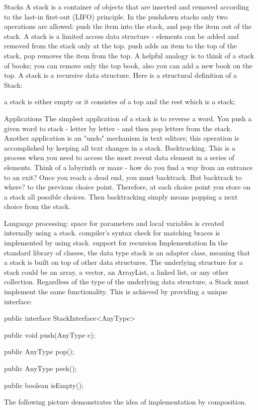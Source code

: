 Stacks
A stack is a container of objects that are inserted and removed according to the last-in first-out (LIFO) principle. In the pushdown stacks only two operations are allowed: push the item into the stack, and pop the item out of the stack. A stack is a limited access data structure - elements can be added and removed from the stack only at the top. push adds an item to the top of the stack, pop removes the item from the top. A helpful analogy is to think of a stack of books; you can remove only the top book, also you can add a new book on the top. A stack is a recursive data structure. Here is a structural definition of a Stack:

a stack is either empty or
it consistes of a top and the rest which is a stack;


Applications
The simplest application of a stack is to reverse a word. You push a given word to stack - letter by letter - and then pop letters from the stack.
Another application is an "undo" mechanism in text editors; this operation is accomplished by keeping all text changes in a stack.
Backtracking. This is a process when you need to access the most recent data element in a series of elements. Think of a labyrinth or maze - how do you find a way from an entrance to an exit? Once you reach a dead end, you must backtrack. But backtrack to where? to the previous choice point. Therefore, at each choice point you store on a stack all possible choices. Then backtracking simply means popping a next choice from the stack.


Language processing:
space for parameters and local variables is created internally using a stack.
compiler's syntax check for matching braces is implemented by using stack.
support for recursion
Implementation
In the standard library of classes, the data type stack is an adapter class, meaning that a stack is built on top of other data structures. The underlying structure for a stack could be an array, a vector, an ArrayList, a linked list, or any other collection. Regardless of the type of the underlying data structure, a Stack must implement the same functionality. This is achieved by providing a unique interface:

public interface StackInterface<AnyType>
{
   public void push(AnyType e);

   public AnyType pop();

   public AnyType peek();

   public boolean isEmpty();
}
The following picture demonstrates the idea of implementation by composition.



